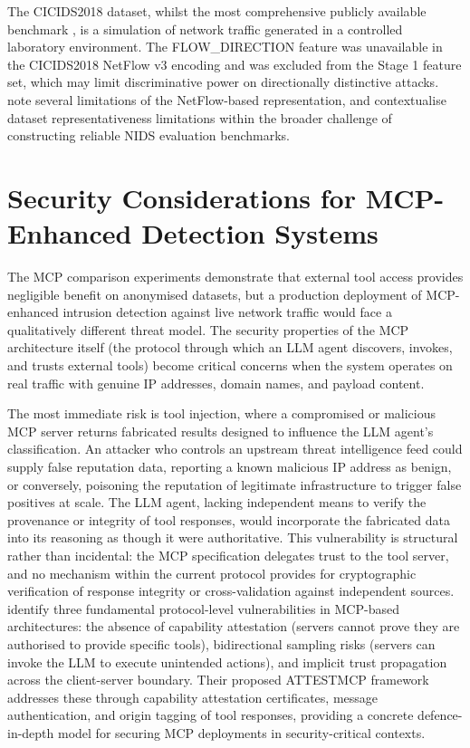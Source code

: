 \documentclass[../main.tex]{subfiles}
\begin{document}
The CICIDS2018 dataset, whilst the most comprehensive publicly available benchmark \autocite{Sharafaldin2018, Leevy2020}, is a simulation of network traffic generated in a controlled laboratory environment. The FLOW\_DIRECTION feature was unavailable in the CICIDS2018 NetFlow v3 encoding and was excluded from the Stage 1 feature set, which may limit discriminative power on directionally distinctive attacks. \textcite{Sarhan2021} note several limitations of the NetFlow-based representation, and \textcite{FengSakurai2025} contextualise dataset representativeness limitations within the broader challenge of constructing reliable NIDS evaluation benchmarks.

\section{Security Considerations for MCP-Enhanced Detection Systems}
\label{sec:mcp-security}

The MCP comparison experiments demonstrate that external tool access provides negligible benefit on anonymised datasets, but a production deployment of MCP-enhanced intrusion detection against live network traffic would face a qualitatively different threat model. The security properties of the MCP architecture itself (the protocol through which an LLM agent discovers, invokes, and trusts external tools) become critical concerns when the system operates on real traffic with genuine IP addresses, domain names, and payload content.

The most immediate risk is tool injection, where a compromised or malicious MCP server returns fabricated results designed to influence the LLM agent's classification. An attacker who controls an upstream threat intelligence feed could supply false reputation data, reporting a known malicious IP address as benign, or conversely, poisoning the reputation of legitimate infrastructure to trigger false positives at scale. The LLM agent, lacking independent means to verify the provenance or integrity of tool responses, would incorporate the fabricated data into its reasoning as though it were authoritative. This vulnerability is structural rather than incidental: the MCP specification delegates trust to the tool server, and no mechanism within the current protocol provides for cryptographic verification of response integrity or cross-validation against independent sources. \textcite{Maloyan2025} identify three fundamental protocol-level vulnerabilities in MCP-based architectures: the absence of capability attestation (servers cannot prove they are authorised to provide specific tools), bidirectional sampling risks (servers can invoke the LLM to execute unintended actions), and implicit trust propagation across the client-server boundary. Their proposed ATTESTMCP framework addresses these through capability attestation certificates, message authentication, and origin tagging of tool responses, providing a concrete defence-in-depth model for securing MCP deployments in security-critical contexts.
\end{document}
